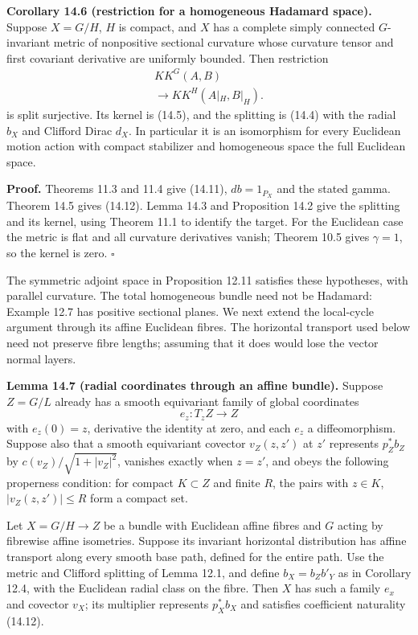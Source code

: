 \documentclass[
  11pt,
]{article}
\begin{document}
\textbf{Corollary 14.6 (restriction for a homogeneous Hadamard space).}
Suppose \(X=G/H\), \(H\) is compact, and \(X\) has a complete simply
connected \(G\)-invariant metric of nonpositive sectional curvature
whose curvature tensor and first covariant derivative are uniformly
bounded. Then restriction \[
\begin{gathered}
KK^G(A,B)\\
\longrightarrow KK^H(A|_H,B|_H).
\end{gathered}
\tag{14.30}
\] is split surjective. Its kernel is (14.5), and the splitting is
(14.4) with the radial \(b_X\) and Clifford Dirac \(d_X\). In particular
it is an isomorphism for every Euclidean motion action with compact
stabilizer and homogeneous space the full Euclidean space.

\textbf{Proof.} Theorems 11.3 and 11.4 give (14.11), \(db=1_{P_X}\) and
the stated gamma. Theorem 14.5 gives (14.12). Lemma 14.3 and Proposition
14.2 give the splitting and its kernel, using Theorem 11.1 to identify
the target. For the Euclidean case the metric is flat and all curvature
derivatives vanish; Theorem 10.5 gives \(\gamma=1\), so the kernel is
zero. \(\square\)

The symmetric adjoint space in Proposition 12.11 satisfies these
hypotheses, with parallel curvature. The total homogeneous bundle need
not be Hadamard: Example 12.7 has positive sectional planes. We next
extend the local-cycle argument through its affine Euclidean fibres. The
horizontal transport used below need not preserve fibre lengths;
assuming that it does would lose the vector normal layers.

\textbf{Lemma 14.7 (radial coordinates through an affine bundle).}
Suppose \(Z=G/L\) already has a smooth equivariant family of global
coordinates \[
e_z:T_zZ\longrightarrow Z
\tag{14.31}
\] with \(e_z(0)=z\), derivative the identity at zero, and each \(e_z\)
a diffeomorphism. Suppose also that a smooth equivariant covector
\(v_Z(z,z')\) at \(z'\) represents \(p_Z^*b_Z\) by
\(c(v_Z)/\sqrt{1+|v_Z|^2}\), vanishes exactly when \(z=z'\), and obeys
the following properness condition: for compact \(K\subset Z\) and
finite \(R\), the pairs with \(z\in K\), \(|v_Z(z,z')|\leq R\) form a
compact set.

Let \(X=G/H\to Z\) be a bundle with Euclidean affine fibres and \(G\)
acting by fibrewise affine isometries. Suppose its invariant horizontal
distribution has affine transport along every smooth base path, defined
for the entire path. Use the metric and Clifford splitting of Lemma
12.1, and define \(b_X=b_Zb'_Y\) as in Corollary 12.4, with the
Euclidean radial class on the fibre. Then \(X\) has such a family
\(e_x\) and covector \(v_X\); its multiplier represents \(p_X^*b_X\) and
satisfies coefficient naturality (14.12).
\end{document}
